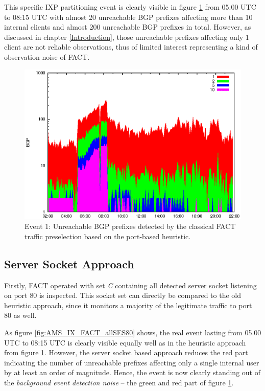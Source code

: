 This specific IXP partitioning event is clearly visible in figure \ref{fig:AMS_IX_FACT_REF} from 05.00 UTC to 08:15 UTC with almost 20 unreachable BGP prefixes affecting more than 10 internal clients and almost 200 unreachable BGP prefixes in total. However, as discussed in chapter \ref{Introduction}, those unreachable prefixes affecting only 1 client are not reliable observations, thus of limited interest representing a kind of observation noise of FACT. 
\begin{figure}
	[p] \centering 
	\includegraphics[width=0.75\linewidth]{images/events/2010_03_25/bgp_log_port80_ref.eps} \caption{Event 1: Unreachable BGP prefixes detected by the classical FACT traffic preselection based on the port-based heuristic.} 
	\label{fig:AMS_IX_FACT_REF} 
\end{figure}

\subsection{Server Socket Approach}

Firstly, FACT operated with set \emph{C} containing all detected server socket listening on port 80 is inspected. This socket set can directly be compared to the old heuristic approach, since it monitors a majority of the legitimate traffic to port 80 as well. 

As figure \ref{fig:AMS_IX_FACT_allSES80} shows, the real event lasting from 05.00 UTC to 08:15 UTC is clearly visible equally well as in the heuristic approach from figure \ref{fig:AMS_IX_FACT_REF}. However, the server socket based approach reduces the red part indicating the number of unreachable prefixes affecting only a single internal user by at least an order of magnitude. Hence, the event is now clearly standing out of the \emph{background event detection noise} -- the green and red part of figure \ref{fig:AMS_IX_FACT_REF}. 

